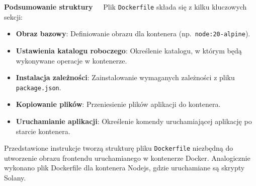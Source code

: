 \noindent \textbf{Podsumowanie struktury~~}
Plik \texttt{Dockerfile} składa się z kilku kluczowych sekcji:
\begin{itemize}
    \item \textbf{Obraz bazowy}: Definiowanie obrazu dla kontenera (np.\ \texttt{node:20-alpine}).
    \item \textbf{Ustawienia katalogu roboczego}: Określenie katalogu, w którym będą wykonywane operacje w kontenerze.
    \item \textbf{Instalacja zależności}: Zainstalowanie wymaganych zależności z pliku \texttt{package.json}.
    \item \textbf{Kopiowanie plików}: Przeniesienie plików aplikacji do kontenera.
    \item \textbf{Uruchamianie aplikacji}: Określenie komendy uruchamiającej aplikację po starcie kontenera.
\end{itemize}

\noindent Przedstawione instrukcje tworzą strukturę pliku \texttt{Dockerfile} niezbędną do utworzenie obrazu frontendu uruchamianego w kontenerze Docker. Analogicznie wykonano plik Dockerfile dla kontenera Nodejs, gdzie uruchamiane są skrypty Solany.

